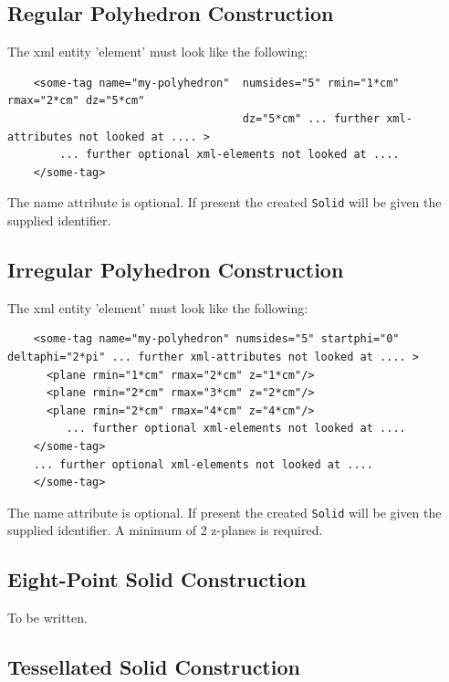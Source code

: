 \subsection{Regular Polyhedron Construction}
\label{sec:dd4hep-manual-plugin-regular-polyhedron-shape}

The xml entity 'element' must look like the following:
\begin{verbatim}
    <some-tag name="my-polyhedron"  numsides="5" rmin="1*cm" rmax="2*cm" dz="5*cm"
                                    dz="5*cm" ... further xml-attributes not looked at .... >
        ... further optional xml-elements not looked at .... 
    </some-tag>
 \end{verbatim}
The name attribute is optional. If present the created \texttt{Solid} will be given the supplied identifier.

\subsection{Irregular Polyhedron Construction}
\label{sec:dd4hep-manual-plugin-regular-polyhedron-shape}

The xml entity 'element' must look like the following:
\begin{verbatim}
    <some-tag name="my-polyhedron" numsides="5" startphi="0" deltaphi="2*pi" ... further xml-attributes not looked at .... >
      <plane rmin="1*cm" rmax="2*cm" z="1*cm"/>
      <plane rmin="2*cm" rmax="3*cm" z="2*cm"/>
      <plane rmin="2*cm" rmax="4*cm" z="4*cm"/>
         ... further optional xml-elements not looked at .... 
    </some-tag>
    ... further optional xml-elements not looked at .... 
    </some-tag>
 \end{verbatim}
The name attribute is optional. If present the created \texttt{Solid} will be given the supplied identifier.
A minimum of 2 z-planes is required.

\subsection{Eight-Point Solid Construction}
\label{sec:dd4hep-manual-plugin-eight-point-shape}

To be written.

\subsection{Tessellated Solid Construction}
\label{sec:dd4hep-manual-plugin-tessellated-shape}

